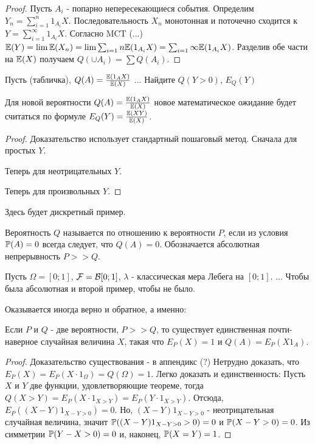 {\begin{proof}
Пусть $A_{i}$ - попарно непересекающиеся события. Определим $Y_{n}=\sum_{i=1}^{n}1_{A_{i}}X$. Последовательность $X_{n}$ монотонная и поточечно сходится к $Y=\sum_{i=1}^{\infty}1_{A_{i}}X$. Согласно MCT (...) $\E(Y)=\lim \E(X_{n})=\lim \sum_{i=1}{n} \E(1_{A_{i}}X)=\sum_{i=1}{\infty} \E(1_{A_{i}}X)$. Разделив обе части на $\E(X)$ получаем $Q(\cup A_{i})=\sum Q(A_{i})$.
\end{proof}

\begin{myex} Пусть (табличка), $Q(A)=\frac{\E(1_{A}X)}{\E(X)}$
...
Найдите $Q(Y>0)$, $E_{Q}(Y)$
\end{myex}

\begin{myth} Для новой вероятности $Q(A)=\frac{\E(1_{A}X)}{\E(X)}$ новое математическое ожидание будет считаться по формуле $E_{Q}(Y)=\frac{\E(XY)}{\E(X)}$.
\end{myth}
\begin{proof} Доказательство использует стандартный пошаговый метод.
Сначала для простых $Y$.

Теперь для неотрицательных $Y$.

Теперь для произвольных $Y$.
\end{proof}

\begin{myex} Здесь будет дискретный пример.
\end{myex}


\begin{mydef} Вероятность $Q$ называется  по отношению к вероятности $P$, если из условия $\P(A)=0$ всегда следует, что $Q(A)=0$. Обозначается абсолютная непрерывность $P>>Q$.
\end{mydef}
\begin{myex} Пусть $\Omega=[0;1]$, $\F=\B[0;1]$, $\lambda$ - классическая мера Лебега на $[0;1]$. ... Чтобы была абсолютная и второй пример, чтобы не было.
\end{myex}



Оказывается иногда верно и обратное, а именно:
\begin{myth} Если $P$ и $Q$ - две вероятности, $P>>Q$, то существует единственная почти-наверное случайная величина $X$, такая что $E_{P}(X)=1$ и $Q(A)=E_{P}(X1_{A})$.
\end{myth}
\begin{proof} Доказательство существования - в аппендикс (?)
Нетрудно доказать, что $E_{P}(X)=E_{P}(X\cdot 1_{\Omega})=Q(\Omega)=1$. Легко доказать и единственность:
Пусть $X$ и $Y$ две функции, удовлетворяющие теореме, тогда $Q(X>Y)=E_{P}(X\cdot 1_{X>Y})=E_{P}(Y\cdot 1_{X>Y})$. Отсюда, $E_{P}((X-Y)1_{X-Y>0})=0$. Но, $(X-Y)1_{X-Y>0}$ - неотрицательная случайная величина, значит $\P((X-Y)1_{X-Y>0}>0)=0$ и $\P(X-Y>0)=0$. Из симметрии $\P(Y-X>0)=0$ и, наконец, $\P(X=Y)=1$.
\end{proof}

}

